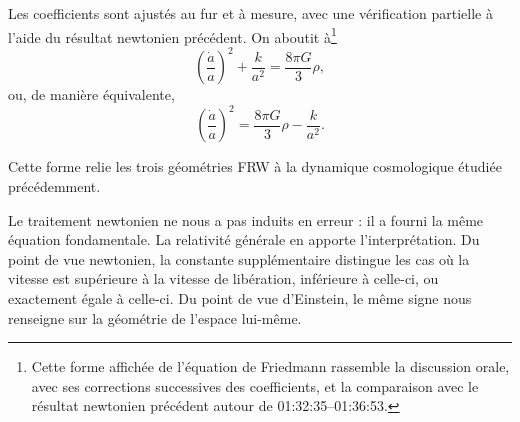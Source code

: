 \begin{classroomqa}
\end{classroomqa}

Les coefficients sont ajustés au fur et à mesure, avec une vérification partielle à l’aide du résultat newtonien précédent. On aboutit à\footnote{Cette forme affichée de l’équation de Friedmann rassemble la discussion orale, avec ses corrections successives des coefficients, et la comparaison avec le résultat newtonien précédent autour de 01:32:35--01:36:53.}
\begin{equation}
\left(\frac{\dot a}{a}\right)^2+\frac{k}{a^2}=\frac{8\pi G}{3}\rho,
\end{equation}
ou, de manière équivalente,
\begin{equation}
\left(\frac{\dot a}{a}\right)^2=\frac{8\pi G}{3}\rho-\frac{k}{a^2}.
\end{equation}

Cette forme relie les trois géométries FRW à la dynamique cosmologique étudiée précédemment.

\begin{classroomqa}
\end{classroomqa}

\begin{classroomqa}
\end{classroomqa}

Le traitement newtonien ne nous a pas induits en erreur : il a fourni la même équation fondamentale. La relativité générale en apporte l’interprétation. Du point de vue newtonien, la constante supplémentaire distingue les cas où la vitesse est supérieure à la vitesse de libération, inférieure à celle-ci, ou exactement égale à celle-ci. Du point de vue d’Einstein, le même signe nous renseigne sur la géométrie de l’espace lui-même.

